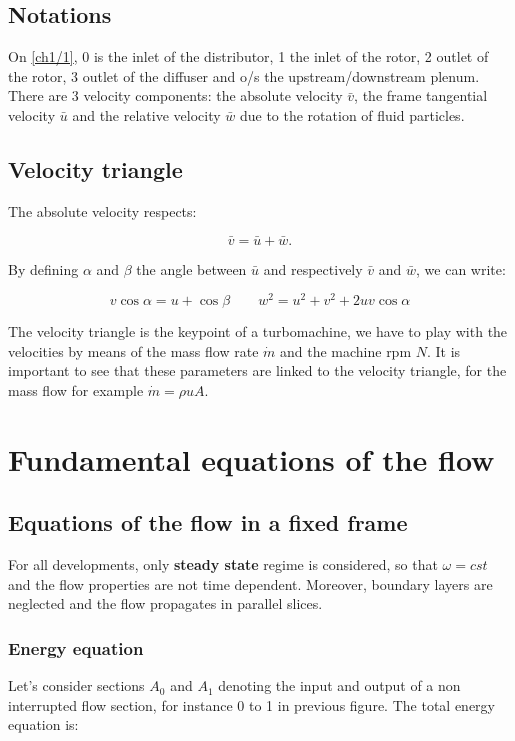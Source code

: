 \subsection{Notations}
On \autoref{ch1/1}, 0 is the inlet of the distributor, 1 the inlet of the rotor, 2 outlet of the rotor, 3 outlet of the diffuser and o/s the upstream/downstream plenum. There are 3 velocity components: the absolute velocity $\bar{v}$, the frame tangential velocity $\bar{u}$ and the relative velocity $\bar{w}$ due to the rotation of fluid particles. 

\subsection{Velocity triangle}
The absolute velocity respects: 

\begin{equation}
\bar{v} = \bar{u} + \bar{w}.
\end{equation}

By defining $\alpha$ and $\beta$ the angle between $\bar{u}$ and respectively $\bar{v}$ and $\bar{w}$, we can write: 

\begin{equation}
v \cos \alpha = u + \cos \beta \qquad w^2 = u^2 + v^2 + 2uv\cos \alpha
\end{equation}

The velocity triangle is the keypoint of a turbomachine, we have to play with the velocities by means of the mass flow rate $\dot{m}$ and the machine rpm $N$. It is important to see that these parameters are linked to the velocity triangle, for the mass flow for example $\dot{m} = \rho u A$. 


\section{Fundamental equations of the flow}
\subsection{Equations of the flow in a fixed frame}
For all developments, only \textbf{steady state} regime is considered, so that $\omega = cst$ and the flow properties are not time dependent. Moreover, boundary layers are neglected and the flow propagates in parallel slices. 

\subsubsection{Energy equation}
Let's consider sections $A_0$ and $A_1$ denoting the input and output of a non interrupted flow section, for instance 0 to 1 in previous figure. The total energy equation is: 

